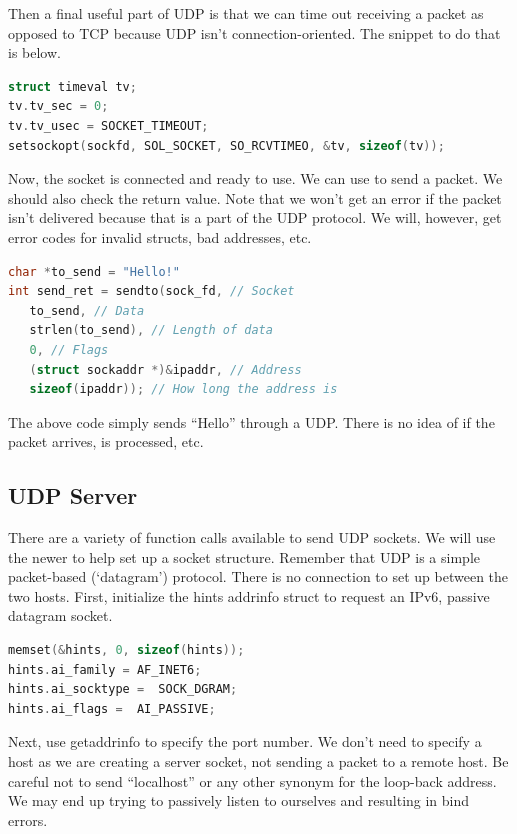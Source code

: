 Then a final useful part of UDP is that we can time out receiving a packet as opposed to TCP because UDP isn't connection-oriented.
The snippet to do that is below.

\begin{lstlisting}[language=C]
struct timeval tv;
tv.tv_sec = 0;
tv.tv_usec = SOCKET_TIMEOUT;
setsockopt(sockfd, SOL_SOCKET, SO_RCVTIMEO, &tv, sizeof(tv));
\end{lstlisting}

Now, the socket is connected and ready to use.
We can use  to send a packet.
We should also check the return value.
Note that we won't get an error if the packet isn't delivered because that is a part of the UDP protocol.
We will, however, get error codes for invalid structs, bad addresses, etc.

\begin{lstlisting}[language=C]
char *to_send = "Hello!"
int send_ret = sendto(sock_fd, // Socket
   to_send, // Data
   strlen(to_send), // Length of data
   0, // Flags
   (struct sockaddr *)&ipaddr, // Address
   sizeof(ipaddr)); // How long the address is
\end{lstlisting}

The above code simply sends ``Hello'' through a UDP.
There is no idea of if the packet arrives, is processed, etc.

\subsection{UDP Server}

There are a variety of function calls available to send UDP sockets.
We will use the newer  to help set up a socket structure.
Remember that UDP is a simple packet-based (`datagram') protocol.
There is no connection to set up between the two hosts.
First, initialize the hints addrinfo struct to request an IPv6, passive datagram socket.

\begin{lstlisting}[language=C]
memset(&hints, 0, sizeof(hints));
hints.ai_family = AF_INET6;
hints.ai_socktype =  SOCK_DGRAM;
hints.ai_flags =  AI_PASSIVE;
\end{lstlisting}

Next, use getaddrinfo to specify the port number.
We don't need to specify a host as we are creating a server socket, not sending a packet to a remote host.
Be careful not to send ``localhost'' or any other synonym for the loop-back address.
We may end up trying to passively listen to ourselves and resulting in bind errors.

